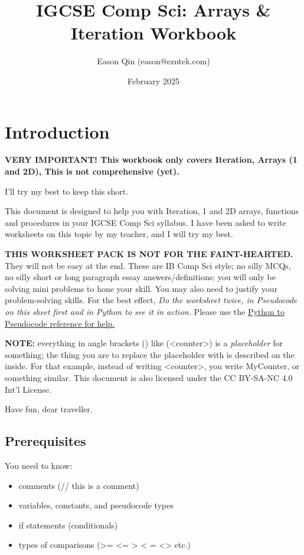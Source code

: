 \documentclass[a4paper, 11pt]{article}
\title{IGCSE Comp Sci: Arrays \& Iteration Workbook}
\author{Eason Qin (eason@ezntek.com)}
\date{February 2025}
\begin{document}
\setlength{\arrayrulewidth}{0.3pt}

\maketitle

\section{Introduction}

{\Large \textbf{VERY IMPORTANT! This workbook only covers Iteration, Arrays (1 and 2D), This is not comprehensive (yet).}}

I'll try my best to keep this short.

This document is designed to help you with Iteration, 1 and 2D arrays, functions and procedures in your IGCSE Comp Sci syllabus. I have been asked to write worksheets on this topic by my teacher, and I will try my best.

\textbf{THIS WORKSHEET PACK IS NOT FOR THE FAINT-HEARTED.} They will not be easy at the end. These are IB Comp Sci style; no silly MCQs, no silly short or long paragraph essay answers/definitions; you will only be solving mini problems to hone your skill. You may also need to justify your problem-solving skills. For the best effect, \emph{Do the worksheet twice, in Pseudocode on this sheet first and in Python to see it in action.} Please use the \href{https://ezntek.com/revision/pseudocode_reference.html}{Python to Pseudocode reference for help.}

\textbf{NOTE:} everything in angle brackets ({\ccmono < >}) like ({\ccmono <counter>}) is a \emph{placeholder} for something; the thing you are to replace the placeholder with is described on the inside. For that example, instead of writing {\ccmono <counter>}, you write {\ccmono MyCounter}, or something similar. This document is also licensed under the CC BY-SA-NC 4.0 Int'l License.

Have fun, dear traveller.

\subsection{Prerequisites}

You need to know:

\begin{itemize}
    \item comments ({\ccmono // this is a comment})
    \item variables, constants, and pseudocode types
    \item if statements (conditionals)
    \item types of comparisons ({\ccmono >= <= > < = <>} etc.)
\end{itemize}
\end{document}
